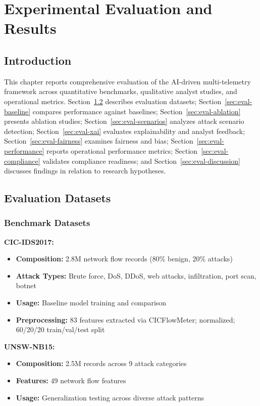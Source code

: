 \chapter{Experimental Evaluation and Results}\label{chap:eval}

\section{Introduction}\label{sec:eval-intro}
This chapter reports comprehensive evaluation of the AI-driven multi-telemetry framework across quantitative benchmarks, qualitative analyst studies, and operational metrics. Section~\ref{sec:eval-datasets} describes evaluation datasets; Section~\ref{sec:eval-baseline} compares performance against baselines; Section~\ref{sec:eval-ablation} presents ablation studies; Section~\ref{sec:eval-scenarios} analyzes attack scenario detection; Section~\ref{sec:eval-xai} evaluates explainability and analyst feedback; Section~\ref{sec:eval-fairness} examines fairness and bias; Section~\ref{sec:eval-performance} reports operational performance metrics; Section~\ref{sec:eval-compliance} validates compliance readiness; and Section~\ref{sec:eval-discussion} discusses findings in relation to research hypotheses.

\section{Evaluation Datasets}\label{sec:eval-datasets}
\subsection{Benchmark Datasets}
\textbf{CIC-IDS2017:}
\begin{itemize}
    \item \textbf{Composition:} 2.8M network flow records (80\% benign, 20\% attacks)
    \item \textbf{Attack Types:} Brute force, DoS, DDoS, web attacks, infiltration, port scan, botnet
    \item \textbf{Usage:} Baseline model training and comparison
    \item \textbf{Preprocessing:} 83 features extracted via CICFlowMeter; normalized; 60/20/20 train/val/test split
\end{itemize}

\textbf{UNSW-NB15:}
\begin{itemize}
    \item \textbf{Composition:} 2.5M records across 9 attack categories
    \item \textbf{Features:} 49 network flow features
    \item \textbf{Usage:} Generalization testing across diverse attack patterns
\end{itemize}

